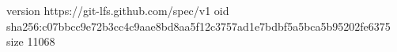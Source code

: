 version https://git-lfs.github.com/spec/v1
oid sha256:c07bbcc9e72b3cc4c9aae8bd8aa5f12c3757ad1e7bdbf5a5bca5b95202fe6375
size 11068
